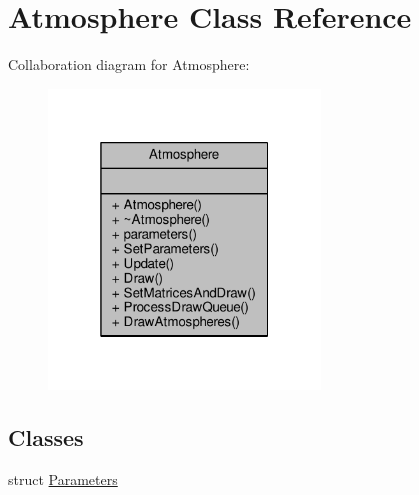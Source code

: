 \hypertarget{classAtmosphere}{}\section{Atmosphere Class Reference}
\label{classAtmosphere}


Collaboration diagram for Atmosphere\+:
\nopagebreak
\begin{figure}[H]
\begin{center}
\leavevmode
\includegraphics[width=205pt]{da/d36/classAtmosphere__coll__graph}
\end{center}
\end{figure}
\subsection*{Classes}
\begin{DoxyCompactItemize}
\item 
struct \hyperlink{structAtmosphere_1_1Parameters}{Parameters}
\end{DoxyCompactItemize}
